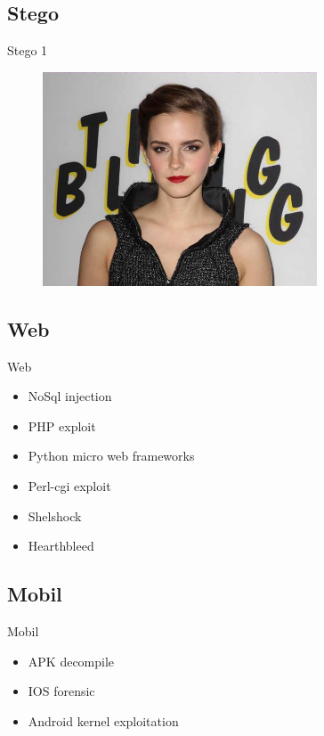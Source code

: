 \documentclass[compress]{beamer}
\begin{document}
\subsection{Stego}

\begin{frame}{Stego 1}
	\begin{figure}
		\centering
		\includegraphics[width=\textwidth,height=2.5in]{images/s11.png}
	\end{figure}
\end{frame}

\subsection{Web}

\begin{frame}{Web}

\begin{itemize}
	\item NoSql injection
    \item PHP exploit
    \item Python micro web frameworks
    \item Perl-cgi exploit
    \item Shelshock
    \item Hearthbleed
\end{itemize}

\end{frame}

\subsection{Mobil}

\begin{frame}{Mobil}

\begin{itemize}
	\item APK decompile
    \item IOS forensic
    \item Android kernel exploitation
\end{itemize}

\end{frame}
\end{document}
